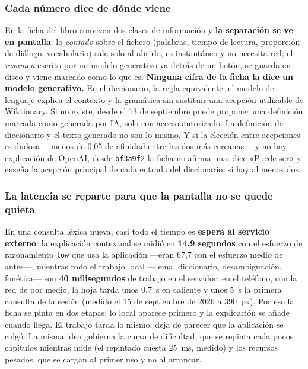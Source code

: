 \documentclass[11pt,a4paper]{article}
\newcommand{\cod}[1]{\texttt{\small #1}}
\begin{document}
\subsubsection{Cada número dice de dónde viene}

En la ficha del libro conviven dos clases de información y \textbf{la separación se ve
en pantalla}: lo \emph{contado} sobre el fichero (palabras, tiempo de lectura,
proporción de diálogo, vocabulario) sale solo al abrirlo, es instantáneo y no necesita
red; el \emph{resumen} escrito por un modelo generativo va detrás de un botón, se
guarda en disco y viene marcado como lo que es. \textbf{Ninguna cifra de la ficha la
dice un modelo generativo.} En el diccionario, la regla equivalente: el modelo de
lenguaje explica el contexto y la gramática sin sustituir una acepción utilizable de
Wiktionary. Si no existe, desde el 13 de septiembre puede proponer una definición
marcada como generada por IA, solo con acceso autorizado. La definición de diccionario y el texto generado no son lo mismo.
Y si la elección entre acepciones es dudosa ---menos de 0,05 de afinidad
entre las dos más cercanas--- y no hay explicación de OpenAI, desde \cod{bf3a9f2}
la ficha no afirma una: dice «Puede ser» y enseña la acepción principal de
cada entrada del diccionario, si hay al menos dos.

\subsubsection{La latencia se reparte para que la pantalla no se quede quieta}

En una consulta léxica nueva, casi todo el tiempo es \textbf{espera al servicio
externo}: la explicación contextual se midió en \textbf{14,9 segundos} con el esfuerzo
de razonamiento \cod{low} que usa la aplicación —eran 67,7 con el esfuerzo medio de
antes—, mientras todo el trabajo local —lema, diccionario, desambiguación, fonética—
son \textbf{40 milisegundos} de trabajo en el servidor; en el teléfono, con la red de
por medio, la hoja tarda unos 0,7~s en caliente y unos 5~s la primera consulta de la
sesión (medido el 15 de septiembre de 2026 a 390~px). Por eso la ficha se pinta en dos
etapas: lo local aparece primero y la explicación se añade cuando llega. El trabajo tarda lo mismo; deja de
parecer que la aplicación se colgó. La misma idea gobierna la curva de dificultad, que
se repinta cada pocos capítulos mientras mide (el repintado cuesta 25~ms, medido) y los
recursos pesados, que se cargan al primer uso y no al arrancar.
\end{document}

